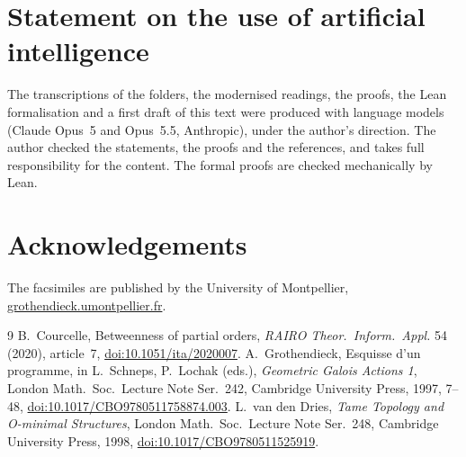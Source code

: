 \documentclass[11pt,a4paper]{amsart}
\theoremstyle{definition}
\theoremstyle{remark}
\begin{document}
\section*{Statement on the use of artificial intelligence}
The transcriptions of the folders, the modernised readings, the proofs, the Lean formalisation and a first draft of this text were produced with language models (Claude Opus~5 and Opus~5.5, Anthropic), under the author's direction. The author checked the statements, the proofs and the references, and takes full responsibility for the content. The formal proofs are checked mechanically by Lean.

\section*{Acknowledgements}
The facsimiles are published by the University of Montpellier, \href{https://grothendieck.umontpellier.fr/}{grothendieck.umontpellier.fr}.

\begin{thebibliography}{9}
 B.~Courcelle, Betweenness of partial orders, \emph{RAIRO Theor.\ Inform.\ Appl.} 54 (2020), article~7, \href{https://doi.org/10.1051/ita/2020007}{doi:10.1051/ita/2020007}.
 A.~Grothendieck, Esquisse d'un programme, in L.~Schneps, P.~Lochak (eds.), \emph{Geometric Galois Actions 1}, London Math.\ Soc.\ Lecture Note Ser.~242, Cambridge University Press, 1997, 7--48, \href{https://doi.org/10.1017/CBO9780511758874.003}{doi:10.1017/CBO9780511758874.003}.
 L.~van den Dries, \emph{Tame Topology and O-minimal Structures}, London Math.\ Soc.\ Lecture Note Ser.~248, Cambridge University Press, 1998, \href{https://doi.org/10.1017/CBO9780511525919}{doi:10.1017/CBO9780511525919}.
\end{thebibliography}
\end{document}
